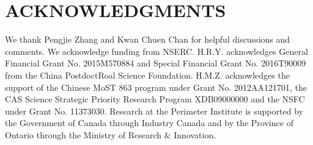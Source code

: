 \documentclass[aps,prd,twocolumn,superscriptaddress,amsfont,amssymb,amsmath,nofootinbib,showpacs,balancelastpage]{revtex4-1}
\begin{document}
\section*{ACKNOWLEDGMENTS}
We thank Pengjie Zhang and Kwan Chuen Chan for helpful discussions and comments.
We acknowledge funding from NSERC.
H.R.Y. acknowledges General Financial Grant No. 2015M570884 and Special Financial Grant No. 2016T90009 from the China PostdoctRoal Science Foundation.
H.M.Z. acknowledges the support of the Chinese MoST 863 program under Grant
No. 2012AA121701, the CAS Science Strategic Priority Research Program
XDB09000000 and the NSFC under Grant No. 11373030.
Research at the Perimeter Institute is supported by the Government of Canada
through Industry Canada and by the Province of Ontario through the Ministry of
Research $\&$ Innovation.

%


\end{document}
